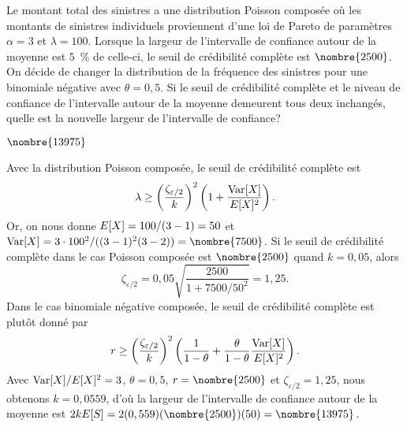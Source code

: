 \begin{exercice}
  Le montant total des sinistres a une distribution Poisson composée
  où les montants de sinistres individuels proviennent d'une loi de
  Pareto de paramètres $\alpha = 3$ et $\lambda = 100$. Lorsque la
  largeur de l'intervalle de confiance autour de la moyenne est $5$~\%
  de celle-ci, le seuil de crédibilité complète est $\nombre{2500}$. On
  décide de changer la distribution de la fréquence des sinistres pour
  une binomiale négative avec $\theta = 0,5$. Si le seuil de
  crédibilité complète et le niveau de confiance de l'intervalle
  autour de la moyenne demeurent tous deux inchangés, quelle est la
  nouvelle largeur de l'intervalle de confiance?
  \begin{rep}
    $\nombre{13975}$
  \end{rep}
  \begin{sol}
    Avec la distribution Poisson composée, le seuil de crédibilité
    complète est
    \begin{displaymath}
      \lambda \geq
      \left( \frac{\zeta_{\varepsilon/2}}{k} \right)^2
      \left( 1 + \frac{\operatorname{Var} [ X ]}{E [ X ]^2} \right).
    \end{displaymath}
    Or, on nous donne $E [ X ] = 100/(3 - 1) = 50$ et $\var{X} = 3
    \cdot 100^2/((3 - 1)^2 (3 - 2)) = \nombre{7500}$. Si le seuil de
    crédibilité complète dans le cas Poisson composée est
    $\nombre{2500}$ quand $k = 0,05$, alors
    \begin{displaymath}
      \zeta_{\varepsilon/2}
      = 0,05 \sqrt{\frac{2500}{1 + 7500/50^2}}
      = 1,25.
    \end{displaymath}
    Dans le cas binomiale négative composée, le seuil de crédibilité
    complète est plutôt donné par
    \begin{displaymath}
      r \geq
      \left(
        \frac{\zeta_{\varepsilon/2}}{k}
      \right)^2
      \left(
        \frac{1}{1 - \theta} +
        \frac{\theta}{1-\theta} \frac{\operatorname{Var} [ X ]}{E [ X ]^2}
      \right).
    \end{displaymath}
    Avec $\operatorname{Var} [ X ]/E [ X ]^2 = 3$, $\theta = 0,5$, $r = \nombre{2500}$
    et $\zeta_{\varepsilon/2} = 1,25$, nous obtenons $k = 0,0559$, d'où la
    largeur de l'intervalle de confiance autour de la moyenne est $2 k
    \esp{S} = 2 (0,559) (\nombre{2500}) (50) = \nombre{13975}$.
  \end{sol}
\end{exercice}

